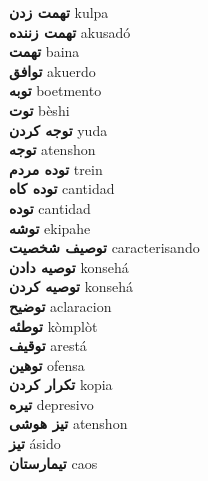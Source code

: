 \textbf{ تهمت زدن  } kulpa \\
\textbf{ تهمت زننده  } akusadó \\
\textbf{ تهمت  } baina \\
\textbf{ توافق  } akuerdo \\
\textbf{ توبه  } boetmento \\
\textbf{ توت  } bèshi \\
\textbf{ توجه کردن  } yuda \\
\textbf{ توجه  } atenshon \\
\textbf{ توده مردم  } trein \\
\textbf{ توده کاه  } cantidad \\
\textbf{ توده  } cantidad \\
\textbf{ توشه  } ekipahe \\
\textbf{ توصیف شخصیت  } caracterisando \\
\textbf{ توصیه دادن  } konsehá \\
\textbf{ توصیه کردن  } konsehá \\
\textbf{ توضیح  } aclaracion \\
\textbf{ توطئه  } kòmplòt \\
\textbf{ توقیف  } arestá \\
\textbf{ توهین  } ofensa \\
\textbf{ تکرار کردن  } kopia \\
\textbf{ تیره  } depresivo \\
\textbf{ تیز هوشی  } atenshon \\
\textbf{ تیز  } ásido \\
\textbf{ تیمارستان  } caos \\
